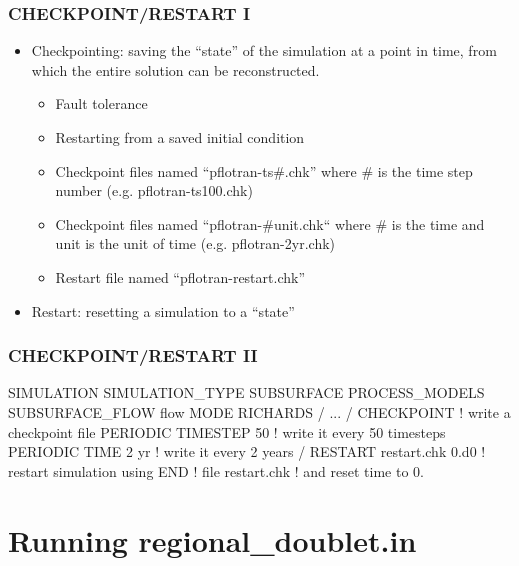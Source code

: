\documentclass{beamer}
\newcommand\redcomment[1]{{{\color{red} #1}}}
\newcommand\bluecomment[1]{{{\color{blue} #1}}}
\begin{document}
\begin{frame}[fragile]\frametitle{CHECKPOINT/RESTART I}

\begin{itemize}
\item Checkpointing: saving the ``state'' of the simulation at a point in time, from which the entire solution can be reconstructed.
  \begin{itemize}
    \item Fault tolerance
    \item Restarting from a saved initial condition
    \item Checkpoint files named ``pflotran-ts\#.chk'' where \# is the time step number (e.g. pflotran-ts100.chk)
    \item Checkpoint files named ``pflotran-\#unit.chk`` where \# is the time and unit is the unit of time (e.g. pflotran-2yr.chk)
    \item Restart file named ``pflotran-restart.chk''
  \end{itemize}
\item Restart: resetting a simulation to a ``state''
\end{itemize}

\end{frame}

\begin{frame}[fragile]\frametitle{CHECKPOINT/RESTART II}

\begin{semiverbatim}

SIMULATION
  SIMULATION_TYPE SUBSURFACE
  PROCESS_MODELS
    SUBSURFACE_FLOW flow
      MODE RICHARDS
    /
    ...
  /
  CHECKPOINT               \bluecomment{! write a checkpoint file}
    PERIODIC TIMESTEP 50   \bluecomment{! write it every 50 timesteps}
    PERIODIC TIME 2 yr     \bluecomment{! write it every 2 years}
  /
  RESTART restart.chk \redcomment{0.d0}  \bluecomment{! restart simulation using}
END                         \bluecomment{! file \redcomment{restart.chk}}
                            \bluecomment{! and reset time to 0.}

\end{semiverbatim}

\end{frame}

\section{Running regional_doublet.in}
\end{document}
